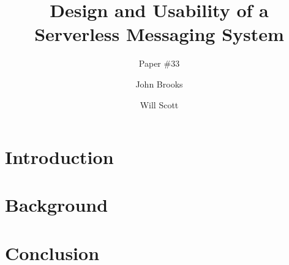 \documentclass{sig-alternate-10pt}
\title{Design and Usability of a Serverless Messaging System}
\author{Paper \#33}
\author{John Brooks}
\author{Will Scott}
\begin{document}
\maketitle

\begin{abstract}
%
\end{abstract}




\section{Introduction}
%

\section{Background}
%

\section{Conclusion}
%


\pagebreak

  



\end{document}
